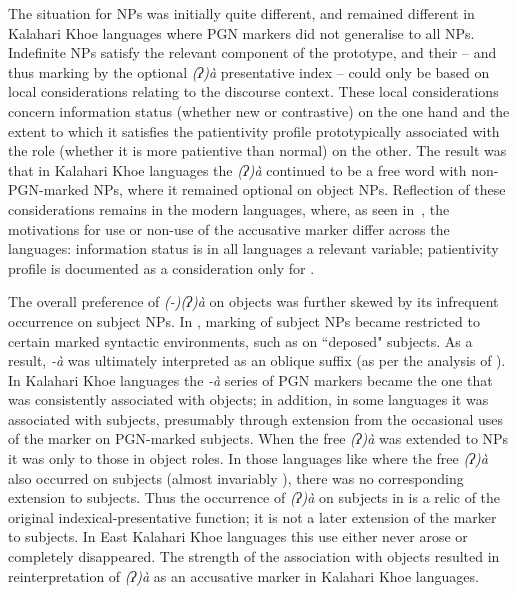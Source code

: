 \documentclass[output=paper]{LSP/langsci}
\begin{document}
The situation for  NPs was initially quite different, and remained different in Kalahari Khoe languages where PGN markers did not generalise to all NPs. Indefinite NPs satisfy the relevant component of the prototype, and their  – and thus marking by the optional \textit{(ʔ)à} presentative index – could only be based on local considerations relating to the discourse context. These local considerations concern information status (\eg whether new or contrastive) on the one hand and the extent to which it satisfies the patientivity profile prototypically associated with the role (whether it is more patientive than normal) on the other. The result was that in Kalahari Khoe languages the \textit{(ʔ)à} continued to be a free word with non-PGN-marked NPs, where it remained optional on object NPs. Reflection of these considerations remains in the modern languages, where, as seen in~, the motivations for use or non-use of the accusative marker differ across the languages: information status is in all languages a relevant variable; patientivity profile is documented as a consideration only for .

The overall preference of \textit{(-)(ʔ)à} on objects was further skewed by its infrequent occurrence on subject NPs. In , marking of subject NPs became restricted to certain marked syntactic environments, such as on ``deposed" subjects. 
As a result, \textit{-à} was ultimately interpreted as an oblique suffix (as per the analysis of \citealt[341]{Haacke2013Gora}). In Kalahari Khoe languages the \textit{-à} series of PGN markers became the one that was consistently associated with objects; in addition, in some languages it was associated with subjects, presumably through extension from the occasional uses of the marker on PGN-marked subjects. When the free \textit{(ʔ)à} was extended to  NPs it was only to those in object roles. In those languages like  where the free \textit{(ʔ)à} also occurred on  subjects (almost invariably ), there was no corresponding extension to  subjects. Thus the occurrence of \textit{(ʔ)à} on subjects in  is a relic of the original indexical-presentative function; it is not a later extension of the marker to subjects. In East Kalahari Khoe languages this use either never arose or completely disappeared. The strength of the association with objects resulted in reinterpretation of \textit{(ʔ)à} as an accusative marker in Kalahari Khoe languages.
\end{document}
